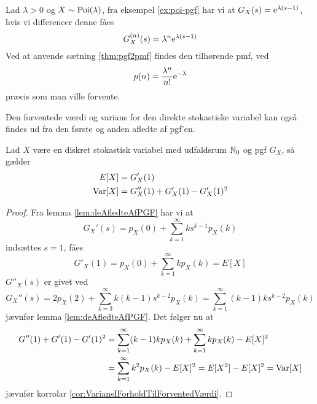 \begin{exmp}
    Lad $\lambda > 0$ og $X \sim \textnormal{Poi}(\lambda)$, fra eksempel \ref{ex:poi-pgf} har vi at $G_X(s) = \mathrm{e}^{\lambda(s-1)}$, hvis vi differencer denne fåes
    \begin{equation*}
        G^{(n)}_X(s) = \lambda^n\mathrm{e}^{\lambda(s-1)}
    \end{equation*}
    Ved at anvende sætning \ref{thm:pgf2pmf} findes den tilhørende pmf, ved
    \begin{equation*}
        p(n) = \frac{\lambda^n}{n!}\mathrm{e}^{-\lambda}
    \end{equation*}
    præcis som man ville forvente.
\end{exmp}

Den forventede værdi og varians for den direkte stokastiske variabel kan også findes ud fra den første og anden afledte af pgf'en.
\begin{prop}\label{prop 3.37} %
    Lad $X$ være en diskret stokastisk variabel med udfaldsrum $\mathbb{N}_0$ og pgf $G_X$, så gælder
    \begin{align*}
        E[X]&=G'_X(1)\\
        \textnormal{Var}[X]&=G_X''(1)+G'_X(1)-G'_X(1)^2
    \end{align*}
\end{prop}

\begin{proof}
    Fra lemma \ref{lem:deAfledteAfPGF} har vi at 
    \begin{equation*}
        G_X'(s) = p_X(0) + \sum_{k=1}^\infty ks^{k-1} p_X(k)
    \end{equation*}
    indsættes $s = 1$, fåes
    \begin{equation*}
        G'_X(1) = p_X(0) + \sum^\infty_{k = 1} kp_X(k) = E[X]
    \end{equation*}
    $G''_X(s)$ er givet ved 
    \begin{equation*}
        G_X''(s) = 2p_X(2) + \sum^\infty_{k = 3} k(k-1) s^{k - 2} p_X(k) = \sum_{k=1}^\infty (k-1)ks^{k-2} p_X(k)
    \end{equation*}
    jævnfør lemma \ref{lem:deAfledteAfPGF}. Det følger nu at
    \begin{align*}
        G''(1)+G'(1)-G'(1)^2&=\sum_{k=1}^\infty (k-1)k p_X(k)+\sum_{k=1}^\infty k p_X(k)-E[X]^2\\
        &=\sum_{k=1}^\infty k^2 p_X(k)-E[X]^2
        =E[X^2]-E[X]^2 =\textnormal{Var}[X]
    \end{align*}
    jævnfør korrolar \ref{cor:VariansIForholdTilForventedVærdi}.
\end{proof}

